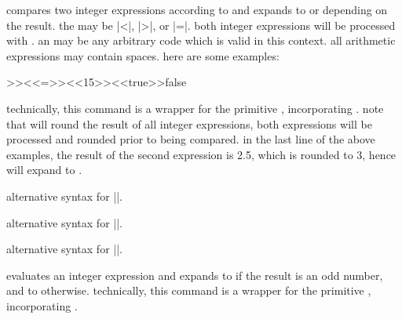 \begin{ltxsyntax}


compares two integer expressions according to  and expands to  or  depending on the result. the  may be |<|, |>|, or |=|. both integer expressions will be processed with . an  may be any arbitrary code which is valid in this context. all arithmetic expressions may contain spaces. here are some examples:

\begin{ltxcode}
\setcounter{counta}{<<6>>}
\setcounter{countb}{<<5>>}
>>{<<=>>}{<<15>>}{<<true>>}{false}
\end{ltxcode}
%
technically, this command is a \latex wrapper for the \tex primitive , incorporating . note that  will round the result of all integer expressions, \ie both expressions will be processed and rounded prior to being compared. in the last line of the above examples, the result of the second expression is 2.5, which is rounded to 3, hence  will expand to .


alternative syntax for ||.


alternative syntax for ||.


alternative syntax for ||.


evaluates an integer expression and expands to  if the result is an odd number, and to  otherwise. technically, this command is a \latex wrapper for the \tex primitive , incorporating .


\end{ltxsyntax}
